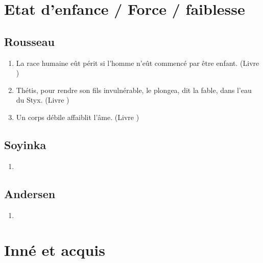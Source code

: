 \documentclass[a4paper, 11pt, hidelinks]{article}
\newcommand{\rb}[1]{\Romanbar{#1}}
\begin{document}
\section{Etat d'enfance / Force / faiblesse}



\subsection{Rousseau}


\begin{enumerate}
    \item La race humaine eût périt si l'homme n'eût commencé par être enfant. (Livre \rb{1})
    \item Thétis, pour rendre son fils invulnérable, le plongea, dit la fable, dans l'eau du Styx. (Livre \rb{1})
    \item Un corps débile affaiblit l'âme. (Livre \rb{1})
\end{enumerate}



\subsection{Soyinka}


\begin{enumerate}
    \item 
\end{enumerate}




\subsection{Andersen}


\begin{enumerate}
    \item 
\end{enumerate}
























\section{Inné et acquis}
\end{document}
